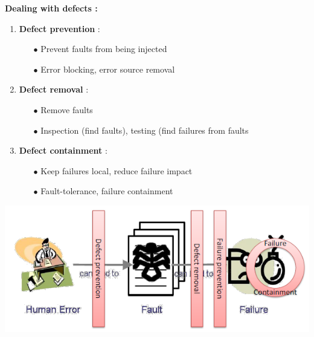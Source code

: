 \documentclass{article}
\begin{document}
\noindent \textbf{Dealing with defects : }
\vspace{-0.3cm}
\begin{multicols}{2}
\begin{enumerate}
    \item \textbf{Defect prevention} :
    \begin{itemize}
        \item [$\bullet$]Prevent faults from being injected
        \item [$\bullet$]Error blocking,
error source
removal
    \end{itemize}
    \item \textbf{Defect removal} :
    \begin{itemize}
        \item [$\bullet$]Remove faults
        \item [$\bullet$]Inspection
(find faults),
testing (find failures from faults
    \end{itemize}
    \item \textbf{Defect containment} :
    \begin{itemize}
        \item [$\bullet$]Keep failures local,
reduce failure impact
        \item [$\bullet$]Fault-tolerance,
failure containment
    \end{itemize}
\end{enumerate}
\columnbreak
\begin{center}
    \includegraphics[scale = 0.5]{image/1.PNG}
\end{center}
\end{multicols}
\end{document}
